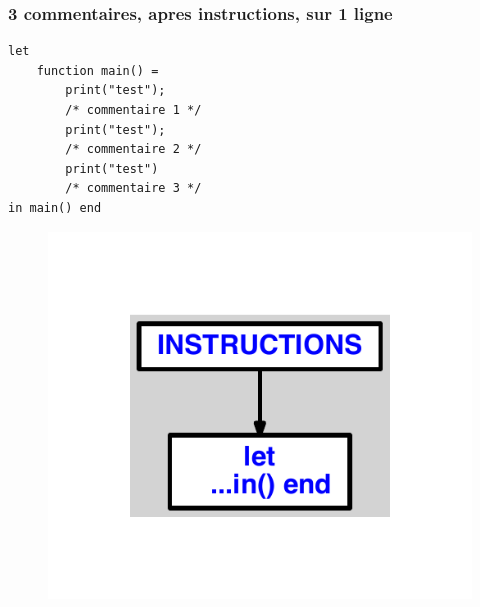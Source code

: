 \documentclass{article}
\begin{document}
\subsubsection{3 commentaires, apres instructions, sur 1 ligne}
\begin{lstlisting}
let
	function main() =
		print("test");
		/* commentaire 1 */
		print("test");
		/* commentaire 2 */
		print("test")
		/* commentaire 3 */
in main() end
\end{lstlisting}
\newpage
\begin{figure}[H]
\centering
\includegraphics[max width=\textwidth]{ast/ast_160.pdf}
\end{figure}
\newpage
\end{document}
